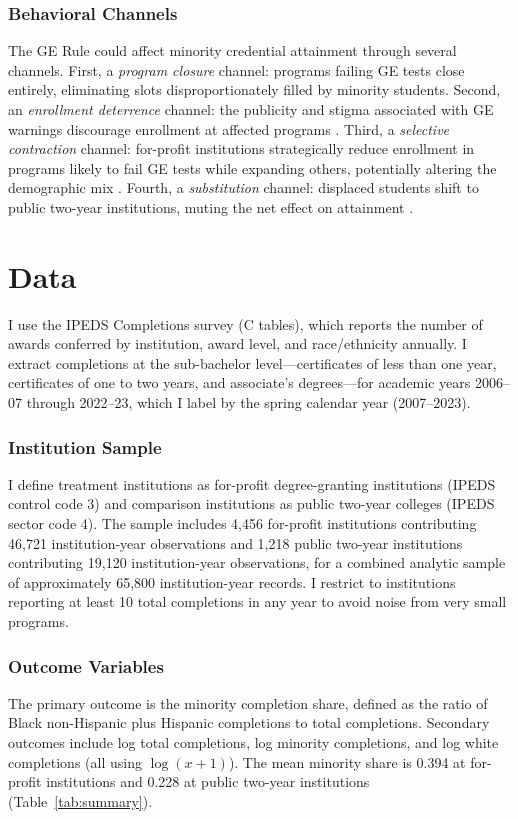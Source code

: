 \documentclass[12pt]{article}
\begin{document}
\subsubsection*{Behavioral Channels} The GE Rule could affect minority credential attainment through several channels. First, a \textit{program closure} channel: programs failing GE tests close entirely, eliminating slots disproportionately filled by minority students. Second, an \textit{enrollment deterrence} channel: the publicity and stigma associated with GE warnings discourage enrollment at affected programs \citep{BirdMacPhee2020}. Third, a \textit{selective contraction} channel: for-profit institutions strategically reduce enrollment in programs likely to fail GE tests while expanding others, potentially altering the demographic mix \citep{ScottClaytonZafar2019}. Fourth, a \textit{substitution} channel: displaced students shift to public two-year institutions, muting the net effect on attainment \citep{Cellini2020}.


\section{Data}

I use the IPEDS Completions survey (C tables), which reports the number of awards conferred by institution, award level, and race/ethnicity annually. I extract completions at the sub-bachelor level---certificates of less than one year, certificates of one to two years, and associate's degrees---for academic years 2006--07 through 2022--23, which I label by the spring calendar year (2007--2023).

\subsubsection*{Institution Sample} I define treatment institutions as for-profit degree-granting institutions (IPEDS control code 3) and comparison institutions as public two-year colleges (IPEDS sector code 4). The sample includes 4,456 for-profit institutions contributing 46,721 institution-year observations and 1,218 public two-year institutions contributing 19,120 institution-year observations, for a combined analytic sample of approximately 65,800 institution-year records. I restrict to institutions reporting at least 10 total completions in any year to avoid noise from very small programs.

\subsubsection*{Outcome Variables} The primary outcome is the minority completion share, defined as the ratio of Black non-Hispanic plus Hispanic completions to total completions. Secondary outcomes include log total completions, log minority completions, and log white completions (all using $\log(x + 1)$). The mean minority share is 0.394 at for-profit institutions and 0.228 at public two-year institutions (Table~\ref{tab:summary}).
\end{document}
